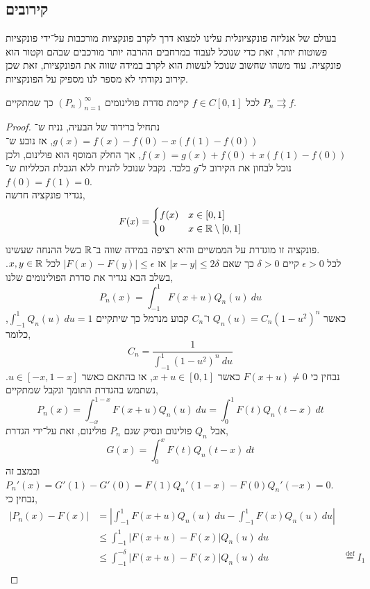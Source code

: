 \subsection{קירובים}
בעולם של אנליזה פונקציונלית עלינו למצוא דרך לקרב פונקציות מורכבות על־ידי פונקציות פשוטות יותר, זאת כדי שנוכל לעבוד במרחבים ההרבה יותר מורכבים שבהם וקטור הוא פונקציה.
עוד משהו שחשוב שנוכל לעשות הוא לקרב במידה שווה את הפונקציות, זאת שכן קירוב נקודתי לא מספר לנו מספיק על הפונקציות.
\begin{theorem}
	לכל $f \in C[0, 1]$ קיימת סדרת פולינומים ${(P_n)}_{n = 1}^\infty$ כך שמתקיים $P_n \rightrightarrows f$.
\end{theorem}
\begin{proof}
	נתחיל ברידוד של הבעיה, נניח ש־$g(x) = f(x) - f(0) - x(f(1) - f(0))$, אז נובע ש־$f(x) = g(x) + f(0) + x(f(1) - f(0))$, אך החלק המוסף הוא פולינום, ולכן נוכל לבחון את הקירוב ל־$g$ בלבד.
	נקבל שנוכל להניח ללא הגבלת הכלליות ש־$f(0) = f(1) = 0$. \\
	נגדיר פונקציה חדשה,
	\[
		F(x)
		= \begin{cases}
			f(x) & x \in [0, 1] \\
			0 & x \in \mathbb{R} \setminus [0, 1]
		\end{cases}
	\] 
	פונקציה זו מוגדרת על הממשיים והיא רציפה במידה שווה ב־$\mathbb{R}$ בשל ההנחה שעשינו. \\
	לכל $\epsilon > 0$ קיים $\delta > 0$ כך שאם $|x - y| \le 2 \delta$ אז $|F(x) - F(y)| \le \epsilon$ לכל $x, y \in \mathbb{R}$.
	בשלב הבא נגדיר את סדרת הפולינומים שלנו,
	\[
		P_n(x)
		= \int_{-1}^{1} F(x + u) Q_n(u)\ du
	\]
	כאשר $Q_n(u) = C_n {(1 - u^2)}^n$ ו־$C_n$ קבוע מנרמל כך שיתקיים $\int_{-1}^{1} Q_n(u)\ du = 1$, כלומר,
	\[
		C_n = \frac{1}{\int_{-1}^{1} {(1 - u^2)}^n\ du}
	\]
	נבחין כי $F(x + u) \ne 0$ כאשר $x + u \in [0, 1]$, או בהתאם כאשר $u \in [-x, 1 - x]$.
	נשתמש בהגדרת התומך ונקבל שמתקיים,
	\[
		P_n(x)
		= \int_{-x}^{1 - x} F(x + u) Q_n(u)\ du
		= \int_0^1 F(t) Q_n(t - x)\ dt
	\]
	אבל $Q_n$ פולינום ונסיק שגם $P_n$ פולינום, זאת על־ידי הגדרת,
	\[
		G(x)
		= \int_{0}^{x} F(t) Q_n(t - x)\ dt
	\]
	ובמצב זה $P_n'(x) = G'(1) - G'(0) = F(1) Q_n'(1 - x) - F(0) Q_n'(-x) = 0$. \\
	נבחין כי,
	\begin{align*}
		|P_n(x) - F(x)|
		& = \left\lvert \int_{-1}^{1} F(x + u) Q_n(u)\ du - \int_{-1}^{1} F(x) Q_n(u)\ du \right\rvert \\
		& \le \int_{-1}^{1} |F(x + u) - F(x)| Q_n(u)\ du \\
		& \le \int_{-1}^{-\delta} |F(x + u) - F(x)| Q_n(u)\ du & \overset{\text{def}}{=}  I_1 \\

\end{align*}
\end{proof}
